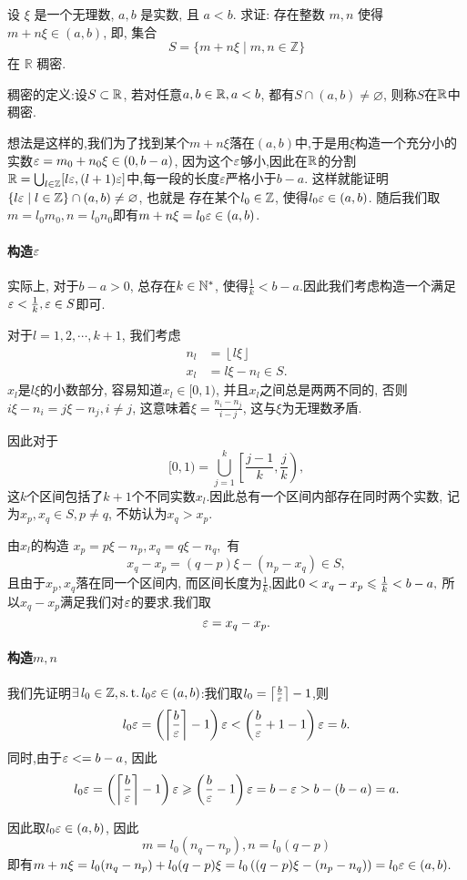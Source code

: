 \begin{exercise}[1.C.16]
    设 $\xi$ 是一个无理数,  $a, b$ 是实数,  且 $a<b$. 求证: 存在整数 $m, n$ 使得 $m+n\xi \in (a, b)$,  即,  集合
    $$ S = \{m+n\xi \mid m,  n \in \mathbb{Z}\} $$
    在 $\mathbb{R}$ 稠密.
\end{exercise}
\begin{solution}
稠密的定义:设$S\subset \mathbb{R}$, 若对任意$a, b\in\mathbb{R}, a<b$, 都有$S\cap(a, b)\neq\varnothing$, 则称$S$在$\mathbb{R}$中稠密.

    想法是这样的,我们为了找到某个$m+n\xi$落在$(a, b)$中,于是用$\xi$构造一个充分小的实数$\varepsilon = m_0 + n_0 \xi \in \left( 0, {b-a} \right)$, 因为这个$\varepsilon$够小,因此在$\mathbb{R}$的分割$\mathbb{R}=\bigcup_{l\in\mathbb{Z}}[l\varepsilon, (l+1)\varepsilon]$中,每一段的长度$\varepsilon$严格小于$b-a$.
    这样就能证明$\{l \varepsilon \mid l\in\mathbb{Z}\} \cap (a, b) \neq \varnothing$, 也就是
    存在某个$l_0\in\mathbb{Z}$, 使得$l_0\varepsilon\in(a, b)$.
    随后我们取$m=l_0m_0, n=l_0n_0$即有$m+n\xi=l_0\varepsilon\in(a, b)$.

    \paragraph*{构造$\varepsilon$}

    实际上, 对于$b-a>0$, 总存在$k\in\mathbb{N}^*$, 使得$\frac{1}{k}<{b-a}$.因此我们考虑构造一个满足$\varepsilon<\frac{1}{k}, \varepsilon\in S$即可.

    对于$l=1, 2, \cdots, k+1$, 我们考虑
    \begin{align*}
        n_l & =\left\lfloor l\xi \right\rfloor \\
        x_l & =l\xi-n_l \in S.
    \end{align*}
    $x_l$是$l\xi$的小数部分, 容易知道$x_l\in[0, 1)$, 并且$x_l$之间总是两两不同的, 否则$i\xi-n_i=j\xi-n_j, i\neq j$, 这意味着$\xi=\frac{n_i-n_j}{i-j}$, 这与$\xi$为无理数矛盾.

    因此对于$$[0, 1)=\bigcup_{j=1}^{k} \left[ \frac{j-1}{k}, \frac{j}{k} \right), $$
    这$k$个区间包括了$k+1$个不同实数$x_l$.因此总有一个区间内部存在同时两个实数, 记为$x_p, x_q \in S, p\neq q$, 不妨认为$x_q>x_p$.

    由$x_l$的构造 $x_p=p\xi-n_p, x_q=q\xi-n_q,$
    有$$ x_q-x_p=(q-p)\xi-(n_p-x_q)\in S,$$
    且由于$x_p, x_q$落在同一个区间内, 而区间长度为$\frac{1}{k}$,因此$0<x_q-x_p\leqslant\frac{1}{k}< {b-a},$
    所以$x_q-x_p$满足我们对$\varepsilon$的要求.我们取$$\varepsilon=x_q-x_p.$$

    \paragraph*{构造$m, n$}

    我们先证明$\exists l_0\in\Z, \st l_0\ve\in(a, b)$:我们取$l_0 = \left\lceil \frac{b}{\varepsilon} \right\rceil - 1$,则$$l_0 \varepsilon = \left(\left\lceil \frac{b}{\varepsilon} \right\rceil - 1\right)\varepsilon < \left(\frac{b}{\varepsilon} + 1 - 1\right)\varepsilon = b.$$
    同时,由于$\varepsilon < ={b-a}$, 因此$$l_0 \varepsilon = \left(\left\lceil \frac{b}{\varepsilon} \right\rceil - 1\right)\varepsilon \geqslant \left(\frac{b}{\varepsilon} - 1\right)\varepsilon = b - \varepsilon > b - (b-a) = a.$$

    因此取$l_0\varepsilon\in(a, b)$, 因此$$m=l_0(n_q-n_p), n=l_0(q-p)$$
    即有$m+n\xi=l_0 (n_q-n_p)+l_0(q-p)\xi=l_0 \left( (q-p)\xi-(n_p-n_q) \right)=l_0\varepsilon\in(a, b).$
\end{solution}


\newpage